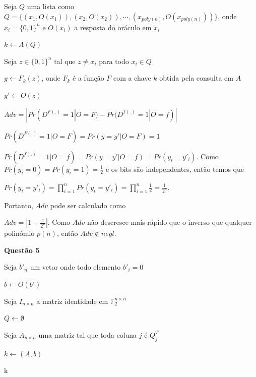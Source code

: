 \documentclass{article}
\begin{document}
        \begin{algorithm}[H]
            \caption{Distinguidor $D$}

            Seja $Q$ uma lista como $Q = \{(x_1,O(x_1)),(x_2,O(x_2)),\cdots,(x_{poly(n)},O(x_{poly(n)}))\}$, onde $x_i = \{0,1\}^n$ e $O(x_i)$ a resposta do oráculo em $x_i$

            $k \leftarrow A(Q)$

            Seja $z \in \{0,1\}^n$ tal que $z \neq x_i$ para todo $x_i \in Q$
            
            $y \leftarrow F_k(z)$, onde $F_k$ é a função $F$ com a chave $k$ obtida pela consulta em $A$
            
            $y' \leftarrow O(z)$

        \end{algorithm}  

        $Adv = |Pr(D^{F(.)} = 1 | O = F) - Pr(D^{f(.)} = 1 | O = f)|$

        $Pr(D^{F(.)} = 1 | O = F) = Pr(y = y'| O = F) = 1$

        $Pr(D^{f(.)} = 1 | O = f) = Pr(y = y' | O = f) = Pr(y_i = y'_i)$. Como $Pr(y_i = 0) = Pr(y_i = 1) = \frac{1}{2}$ e os bits são independentes, então temos que

        $Pr(y_i = y'_i) = \prod_{i = 1}^{n} Pr(y_i = y'_i) = \prod_{i = 1}^{n} \frac{1}{2} = \frac{1}{2^n}$.

        Portanto, $Adv$ pode ser calculado como

        $Adv = |1 - \frac{1}{2^n}|$. Como $Adv$ não descresce mais rápido que o inverso que qualquer polinômio $p(n)$, então $Adv \notin negl$.

\textbf{Questão 5}

        \begin{algorithm}[H]
            \caption{Algoritmo de recuperação de chave $RK$}

            Seja $b'_{n}$ um vetor onde todo elemento $b'_i = 0$

            $b \leftarrow O(b')$

            Seja $I_{n \times n}$ a matriz identidade em $\mathbb{F}_2^{n \times n}$

            $Q \leftarrow \emptyset$


            Seja $A_{n \times n}$ uma matriz tal que toda coluna $j$ é $Q_j^T$

            $k \leftarrow (A,b)$

            \Return k
        \end{algorithm} 
\end{document}
